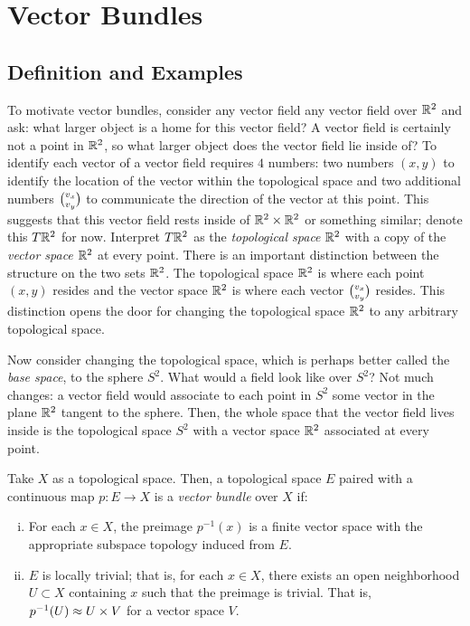 \documentclass[../sean_thesis.tex]{subfiles}
\begin{document}
\chapter{Vector Bundles}
\section{Definition and Examples}

To motivate vector bundles, consider any vector field any vector field over $\mathbb{R}^2$ and ask: what larger object is a home for this vector field? A vector field is certainly not a point in $\mathbb{R}^2$, so what larger object does the vector field lie inside of? To identify each vector of a vector field requires $4$ numbers: two numbers $(x,y)$ to identify the location of the vector within the topological space and two additional numbers $v_x \choose v_y$ to communicate the direction of the vector at this point. This suggests that this vector field rests inside of $\mathbb{R}^2 \times \mathbb{R}^2$ or something similar; denote this $T\mathbb{R}^2$ for now. Interpret $T\mathbb{R}^2$ as the \emph{topological space} $\mathbb{R}^2$ with a copy of the \emph{vector space} $\mathbb{R}^2$ at every point. There is an important distinction between the structure on the two sets $\mathbb{R}^2$. The topological space $\mathbb{R}^2$ is where each point $(x,y) $ resides and the vector space $\mathbb{R}^2$ is where each vector $v_x \choose v_y$ resides. This distinction opens the door for changing the topological space $\mathbb{R}^2$ to any arbitrary topological space.

Now consider changing the topological space, which is perhaps better called the \emph{base space}, to the sphere $S^2$. What would a field look like over $S^2$? Not much changes: a vector field would associate to each point in $S^2$ some vector in the plane $\mathbb{R}^2$ tangent to the sphere. Then, the whole space that the vector field lives inside is the topological space $S^2$ with a vector space $\mathbb{R}^2$ associated at every point.


\begin{definition}
\label{def:vector_bundle}
	Take $X$ as a topological space. Then, a topological space $E$ paired with a continuous map $p: E \to X$ is a \emph{vector bundle} over $X$ if:
\vspace{-\varparskip}
	\begin{enumerate}[(i)]
		\item For each $x \in X$, the preimage $p^{-1}(x)$ is a finite vector space with the appropriate subspace topology induced from $E$.
		\item $E$ is locally trivial; that is, for each $x \in X$, there exists an open neighborhood $U \subset X$ containing $x$ such that the preimage is trivial. That is, $p^{-1}(U) \approx U \times V$ for a vector space $V$.
	\end{enumerate}
\end{definition}
\end{document}
